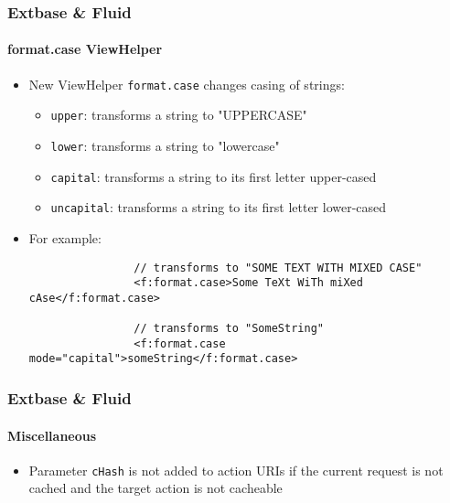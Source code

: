 
\begin{frame}[fragile]
	\frametitle{Extbase \& Fluid}
	\framesubtitle{format.case ViewHelper}

	\begin{itemize}

		\item New ViewHelper \texttt{format.case} changes casing of strings:
			\begin{itemize}
				\item \texttt{upper}: transforms a string to "UPPERCASE"
				\item \texttt{lower}: transforms a string to "lowercase"
				\item \texttt{capital}: transforms a string to its first letter upper-cased
				\item \texttt{uncapital}: transforms a string to its first letter lower-cased
			\end{itemize}

		\item For example:

			\begin{lstlisting}
				// transforms to "SOME TEXT WITH MIXED CASE"
				<f:format.case>Some TeXt WiTh miXed cAse</f:format.case>

				// transforms to "SomeString"
				<f:format.case mode="capital">someString</f:format.case>
			\end{lstlisting}

	\end{itemize}

\end{frame}


\begin{frame}[fragile]
	\frametitle{Extbase \& Fluid}
	\framesubtitle{Miscellaneous}

	\begin{itemize}

		\item Parameter \texttt{cHash} is not added to action URIs if the current
			request is not cached and the target action is not cacheable

	\end{itemize}

\end{frame}
